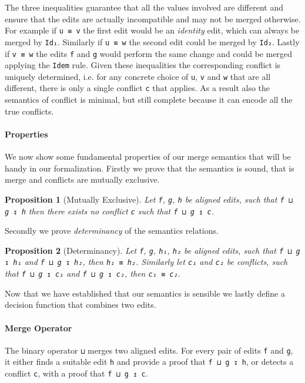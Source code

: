\documentclass[preprint]{sigplanconf}
\theoremstyle{plain}
\newtheorem{prop}{Proposition}
\begin{document}
	The three inequalities guarantee that all the values involved are different
        and ensure that the edits are actually incompatible and may not be merged 
        otherwise. For example if \texttt{u ≡ v} the first edit would be an
        \emph{identity} edit, which can always be merged by
        \texttt{Id₁}. Similarly if \texttt{u ≡ w} the second edit could be merged
        by \texttt{Id₂}. Lastly if \texttt{v ≡ w} the edits \texttt{f} and \texttt{g}
        would perform the same change and could be merged applying the \texttt{Idem}
        rule.
        Given these inequalities the corresponding conflict is uniquely determined,
        i.e. for any concrete choice of \texttt{u}, \texttt{v} and \texttt{w} that
        are all different, there is only a single conflict \texttt{c} that applies.
	As a result also the semantics of conflict is minimal, but still complete
        because it can encode all the true conflicts.

        \paragraph{Properties}
        We now show some fundamental properties of our merge semantics that
        will be handy in our formalization.
        Firstly we prove that the semantics is sound, that is
        merge and conflicts are mutually exclusive.
        \begin{prop}[Mutually Exclusive]
          \label{prop:mutually-exclusive}
          Let \texttt{f}, \texttt{g}, \texttt{h} be aligned edits, such that
          \texttt{f ⊔ g ↧ h} then there exists no conflict \texttt{c} such that
          \texttt{f ⊔ g ↥ c}.
        \end{prop}
        Secondly we prove \emph{determinancy} of the semantics relations.
        \begin{prop}[Determinancy]
          \label{prop:determinancy}
        Let \texttt{f}, \texttt{g}, \texttt{h₁}, \texttt{h₂} be
        aligned edits, such that \texttt{f ⊔ g ↧ h₁} and \texttt{f ⊔ g
          ↧ h₂}, then \texttt{h₁ ≡ h₂}.
        Similarly let \texttt{c₁} and \texttt{c₂} be conflicts, such
        that \texttt{f ⊔ g ↥ c₁} and \texttt{f ⊔ g ↥ c₂}, then
        \texttt{c₁ ≡ c₂}.
        \end{prop}

        Now that we have established that our semantics is sensible we
        lastly define a decision function that combines two edits.

	\paragraph{Merge Operator}
	The binary operator \texttt{⊔} merges two aligned edits.
        For every pair of edits \texttt{f} and \texttt{g}, it either
        finds a suitable edit \texttt{h} and provide a proof that
        \texttt{f ⊔ g ↧ h}, or detects a conflict \texttt{c}, with a
        proof that \texttt{f ⊔ g ↥ c}.
        
\end{document}

